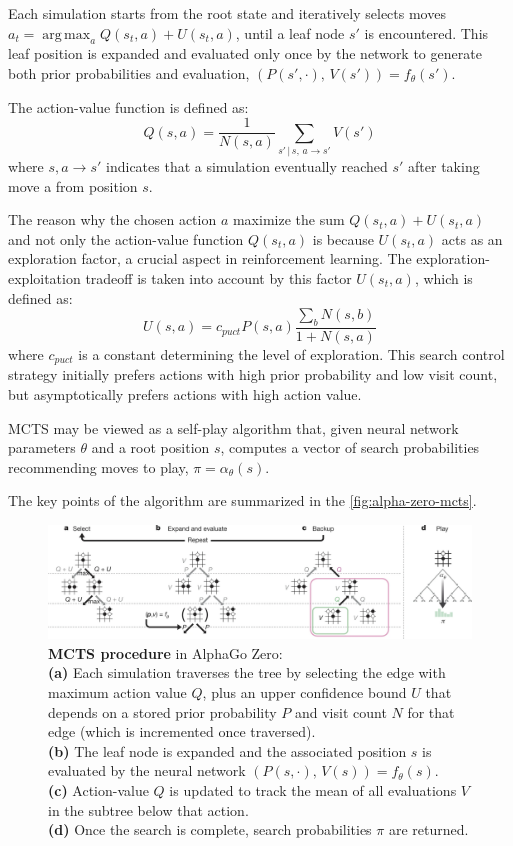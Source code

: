 \documentclass{article}
\DeclareMathOperator*{\argmax}{arg\,max}
\begin{document}
Each simulation starts from the root state and iteratively selects moves $a_t  = \argmax_a{Q(s_t,a) + U(s_t,a)}$, until a leaf node $s'$ is encountered. This leaf position is expanded and evaluated only once by the network to generate both prior probabilities and evaluation, $(P(s', \cdot), \, V(s')) = f_\theta(s')$.

The action-value function is defined as:
\begin{equation}
	Q(s, a) = \frac{1}{N(s,a)} \sum_{s'\, | \, s,\, a \rightarrow s'}{V(s')}
\end{equation}
where $s, a \rightarrow s'$ indicates that a simulation eventually reached $s'$ after taking move a from position $s$.

The reason why the chosen action $a$ maximize the sum $Q(s_t,a) + U(s_t,a)$ and not only the action-value function $Q(s_t, a)$ is because $U(s_t,a)$ acts as an exploration factor, a crucial aspect in reinforcement learning. The exploration-exploitation tradeoff is taken into account by this factor $U(s_t,a)$, which is defined as:
\begin{equation}
	U(s, a) = c_{puct}P(s, a)\frac{\sum_b N(s,b)}{1+N(s,a)}
\end{equation}
where $c_{puct}$ is a constant determining the level of exploration. This search control strategy initially prefers actions with high prior probability and low visit count, but asymptotically prefers actions with high action value.

MCTS may be viewed as a self-play algorithm that, given neural network parameters $\theta$ and a root position $s$, computes a vector of search probabilities recommending moves to play, $\pi = \alpha_\theta(s)$.

The key points of the algorithm are summarized in the \autoref{fig:alpha-zero-mcts}.
\begin{figure}[H]
	\centerline{\includegraphics[width=15cm]{alpha-zero-mcts.png}}
	\caption{\textbf{MCTS procedure} in AlphaGo Zero\cite{Silver_2016}:\\ \textbf{(a)} Each simulation traverses the tree by selecting the edge with maximum action value $Q$, plus an upper confidence bound $U$ that depends on a stored prior probability $P$ and visit count $N$ for that edge (which is incremented once traversed).\\ \textbf{(b)} The leaf node is expanded and the associated position $s$ is evaluated by the neural network $(P(s, \cdot), \, V(s)) = f_\theta(s)$.\\ \textbf{(c)} Action-value $Q$ is updated to track the mean of all evaluations $V$ in the subtree below that action.\\ \textbf{(d)} Once the search is complete, search probabilities $\pi$ are returned.}
	\label{fig:alpha-zero-mcts}
\end{figure}
\end{document}
